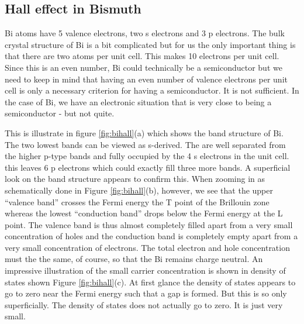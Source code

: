 \documentclass[%
 aip,
 amsmath,amssymb,
 reprint,%
]{revtex4-1}
\begin{document}
    \subsection{Hall effect in Bismuth}
    Bi atoms have 5 valence electrons, two s electrons and 3 p electrons. The bulk
    crystal structure of Bi is a bit complicated but for us the only important thing is
    that there are two atoms per unit cell. This makes 10 electrons per unit cell. Since
    this is an even number, Bi could technically be a semiconductor but we need to
    keep in mind that having an even number of valence electrons per unit cell is only
    a necessary criterion for having a semiconductor. It is not sufficient. In the case
    of Bi, we have an electronic situation that is very close to being a semiconductor -
    but not quite.
    \par
    This is illustrate in figure \ref{fig:bihall}(a) which shows the band structure of Bi. The two
    lowest bands can be viewed as s-derived. The are well separated from the higher
    p-type bands and fully occupied by the 4 s electrons in the unit cell. this leaves
    6 p electrons which could exactly fill three more bands. A superficial look on the
    band structure appears to confirm this. When zooming in as schematically done
    in Figure \ref{fig:bihall}(b), however, we see that the upper “valence band” crosses the Fermi
    energy the T point of the Brillouin zone whereas the lowest “conduction band”
    drops below the Fermi energy at the L point. The valence band is thus almost
    completely filled apart from a very small concentration of holes and the conduction
    band is completely empty apart from a very small concentration of electrons. The
    total electron and hole concentration must the the same, of course, so that the Bi
    remains charge neutral. An impressive illustration of the small carrier concentration
    is shown in density of states shown Figure \ref{fig:bihall}(c). At first glance the density of states
    appears to go to zero near the Fermi energy such that a gap is formed. But this is
    so only superficially. The density of states does not actually go to zero. It is just
    very small.
\end{document}
